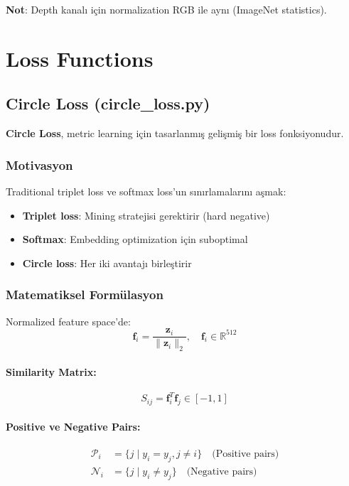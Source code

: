 \documentclass[12pt,a4paper]{article}
\begin{document}
\textbf{Not}: Depth kanalı için normalization RGB ile aynı (ImageNet statistics).

\section{Loss Functions}

\subsection{Circle Loss (circle\_loss.py)}

\textbf{Circle Loss}, metric learning için tasarlanmış gelişmiş bir loss fonksiyonudur.

\subsubsection{Motivasyon}
Traditional triplet loss ve softmax loss'un sınırlamalarını aşmak:
\begin{itemize}
    \item \textbf{Triplet loss}: Mining stratejisi gerektirir (hard negative)
    \item \textbf{Softmax}: Embedding optimization için suboptimal
    \item \textbf{Circle loss}: Her iki avantajı birleştirir
\end{itemize}

\subsubsection{Matematiksel Formülasyon}

Normalized feature space'de:
\begin{equation}
    \mathbf{f}_i = \frac{\mathbf{z}_i}{\|\mathbf{z}_i\|_2}, \quad \mathbf{f}_i \in \mathbb{R}^{512}
\end{equation}

\paragraph{Similarity Matrix:}
\begin{equation}
    S_{ij} = \mathbf{f}_i^T \mathbf{f}_j \in [-1, 1]
\end{equation}

\paragraph{Positive ve Negative Pairs:}
\begin{align}
    \mathcal{P}_i &= \{j \mid y_i = y_j, j \neq i\} \quad \text{(Positive pairs)} \\
    \mathcal{N}_i &= \{j \mid y_i \neq y_j\} \quad \text{(Negative pairs)}
\end{align}
\end{document}
